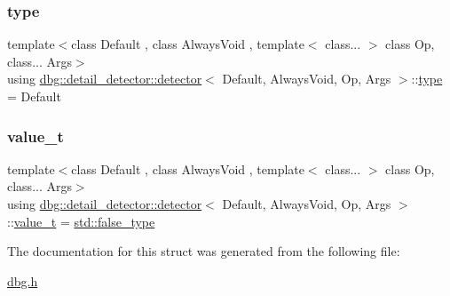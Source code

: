 \subsubsection{\texorpdfstring{type}{type}}
{\footnotesize\ttfamily template$<$class Default , class Always\+Void , template$<$ class... $>$ class Op, class... Args$>$ \\
using \hyperlink{structdbg_1_1detail__detector_1_1detector}{dbg\+::detail\+\_\+detector\+::detector}$<$ Default, Always\+Void, Op, Args $>$\+::\hyperlink{structdbg_1_1detail__detector_1_1detector_aab6b446944545683b9533ea8fc623480}{type} =  Default}

\mbox{\label{structdbg_1_1detail__detector_1_1detector_af1b6da4282d723669e926c52f446a989}} 
\subsubsection{\texorpdfstring{value\+\_\+t}{value\_t}}
{\footnotesize\ttfamily template$<$class Default , class Always\+Void , template$<$ class... $>$ class Op, class... Args$>$ \\
using \hyperlink{structdbg_1_1detail__detector_1_1detector}{dbg\+::detail\+\_\+detector\+::detector}$<$ Default, Always\+Void, Op, Args $>$\+::\hyperlink{structdbg_1_1detail__detector_1_1detector_af1b6da4282d723669e926c52f446a989}{value\+\_\+t} =  \hyperlink{namespacestd_aebe6729ab5488ecc76c762873d226857}{std\+::false\+\_\+type}}



The documentation for this struct was generated from the following file\+:\begin{DoxyCompactItemize}
\item 
\hyperlink{dbg_8h}{dbg.\+h}\end{DoxyCompactItemize}
